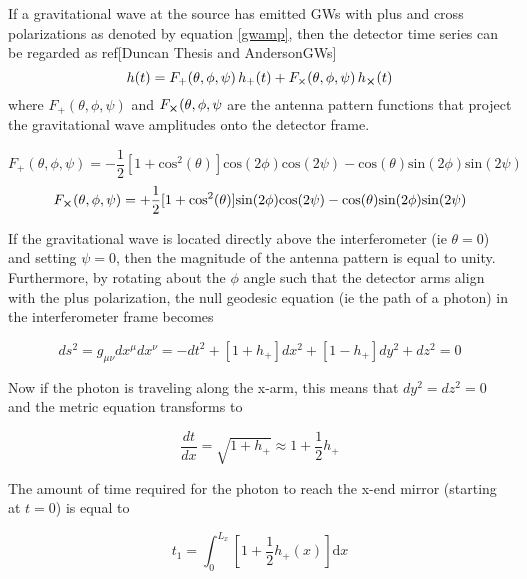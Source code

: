 	If a gravitational wave at the source has emitted GWs with plus and cross polarizations as denoted by equation \ref{gwamp}, then the detector time series can be regarded as ref[Duncan Thesis and AndersonGWs]
	\begin{equation}
	h(t) = F_{+}(\theta,\phi,\psi) \, h_{+}(t) + F_{\times}(\theta,\phi,\psi) \, h_{\cross}(t)
	\end{equation}
	where $F_{+}(\theta,\phi,\psi)$ and $F_{\cross}(\theta,\phi,\psi$ are the antenna pattern functions that project the gravitational wave amplitudes onto the detector frame.
	
	\begin{equation}
	F_{+}(\theta,\phi,\psi) = -\frac{1}{2}[1+\text{cos}^2(\theta)] \text{cos}(2\phi) \text{cos}(2\psi) - \text{cos}(\theta) \text{sin}(2\phi) \text{sin}(2\psi)
	\end{equation}
	\begin{equation}
	F_{\cross}(\theta,\phi,\psi) = + \frac{1}{2}[1+\text{cos}^2(\theta)] \text{sin}(2\phi) \text{cos}(2\psi) - \text{cos}(\theta) \text{sin}(2\phi) \text{sin}(2\psi)
	\end{equation}
	
	If the gravitational wave is located directly above the interferometer (ie $\theta = 0$) and setting $\psi=0$, then the magnitude of the antenna pattern is equal to unity.  Furthermore, by rotating about the $\phi$ angle such that the detector arms align with the plus polarization, the null geodesic equation (ie the path of a photon) in the interferometer frame becomes 
	
	\begin{equation}
	ds^2 = g_{\mu\nu}dx^{\mu} dx^{\nu} = -dt^2 + [1+h_{+}]  dx^2 + [1-h_{+}]  dy^2 + dz^2 = 0
	\end{equation}
	
	Now if the photon is traveling along the x-arm, this means that $dy^2 = dz^2 = 0$ and the metric equation transforms to
	
	\begin{equation}
	\frac{dt}{dx} = \sqrt{ 1+h_{+} } \approx 1+\frac{1}{2} h_{+} 
	\end{equation}
	
	The amount of time required for the photon to reach the x-end mirror (starting at $t=0$) is equal to
	
	\begin{equation}\label{pathlength}
	t_1 = \int_{0}^{L_{x}} [1+\frac{1}{2}  h_{+}(x) ] \text{d}x
	\end{equation}
	
